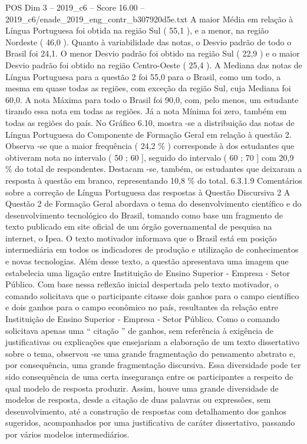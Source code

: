 \begin{textsample}{POS Dim 3 – 2019\_c6 – Score 16.00 – 2019\_c6/enade\_2019\_eng\_contr\_b307920d5e.txt}
A maior Média em relação à Língua Portuguesa foi obtida na região Sul ( 55,1 ), e a menor, na região Nordeste ( 46,0 ).
Quanto à variabilidade das notas, o Desvio padrão de todo o Brasil foi 24,1.
O menor Desvio padrão foi obtido na região Sul ( 22,9 ) e o maior Desvio padrão foi obtido na região Centro-Oeste ( 25,4 ).
A Mediana das notas de Língua Portuguesa para a questão 2 foi 55,0 para o Brasil, como um todo, a mesma em quase todas as regiões, com exceção da região Sul, cuja Mediana foi 60,0.
A nota Máxima para todo o Brasil foi 90,0, com, pelo menos, um estudante tirando essa nota em todas as regiões.
Já a nota Mínima foi zero, também em todas as regiões do país.
No Gráfico 6.10, mostra -se a distribuição das notas de Língua Portuguesa do Componente de Formação Geral em relação à questão 2.
Observa -se que a maior frequência ( 24,2 \% ) corresponde à dos estudantes que obtiveram nota no intervalo ( 50 ; 60 ], seguido do intervalo ( 60 ; 70 ] com 20,9 \% do total de respondentes.
Destacam -se, também, os estudantes que deixaram a resposta à questão em branco, representando 10,8 \% do total. 6.3.1.9 Comentários sobre a correção de Língua Portuguesa das respostas à Questão Discursiva 2 A Questão 2 de Formação Geral abordava o tema do desenvolvimento científico e do desenvolvimento tecnológico do Brasil, tomando como base um fragmento de texto publicado em site oficial de um órgão governamental de pesquisa na internet, o Ipea.
O texto motivador informava que o Brasil está em posição intermediária em todos os indicadores de produção e utilização de conhecimentos e novas tecnologias.
Além desse texto, a questão apresentava uma imagem que estabelecia uma ligação entre Instituição de Ensino Superior - Empresa - Setor Público.
Com base nessa reflexão inicial despertada pelo texto motivador, o comando solicitava que o participante citasse dois ganhos para o campo científico e dois ganhos para o campo econômico no país, resultantes da relação entre Instituição de Ensino Superior - Empresa - Setor Público.
Como o comando solicitava apenas uma “ citação ” de ganhos, sem referência à exigência de justificativas ou explicações que ensejariam a elaboração de um texto dissertativo sobre o tema, observou -se uma grande fragmentação do pensamento abstrato e, por consequência, uma grande fragmentação discursiva.
Essa diversidade pode ter sido consequência de uma certa insegurança entre os participantes a respeito de qual modelo de resposta produzir.
Assim, houve uma grande diversidade de modelos de resposta, desde a citação de duas palavras ou expressões, sem desenvolvimento, até a construção de respostas com detalhamento dos ganhos sugeridos, acompanhados por uma justificativa de caráter dissertativo, passando por vários modelos intermediários.

\end{textsample}

